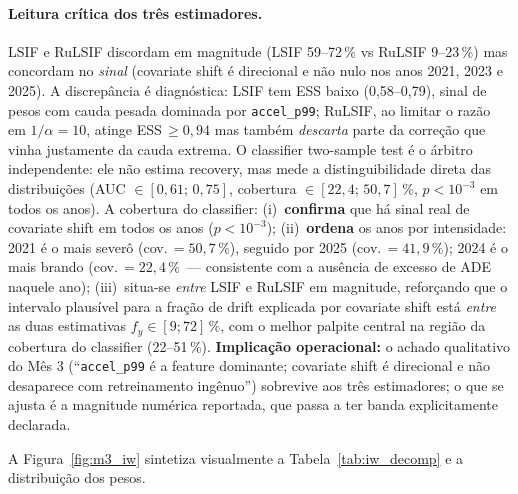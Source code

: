\documentclass[11pt,a4paper]{article}
\begin{document}
\paragraph{Leitura cr\'itica dos tr\^es estimadores.}
LSIF e RuLSIF discordam em magnitude (LSIF 59--72\,\% vs RuLSIF 9--23\,\%) mas concordam no \emph{sinal} (covariate shift \'e direcional e n\~ao nulo nos anos 2021, 2023 e 2025). A discrep\^ancia \'e diagn\'ostica:
LSIF tem ESS baixo (0{,}58--0{,}79), sinal de pesos com cauda pesada dominada por \texttt{accel\_p99};
RuLSIF, ao limitar o raz\~ao em $1/\alpha\!=\!10$, atinge ESS\,$\geq\!0{,}94$ mas tamb\'em \emph{descarta} parte da corre\c{c}\~ao que vinha justamente da cauda extrema.
O classifier two-sample test \cite{lopezpaz2017} \'e o \'arbitro independente: ele n\~ao estima recovery, mas mede a distinguibilidade direta das distribui\c{c}\~oes (AUC $\in [0{,}61;\,0{,}75]$, cobertura $\in[22{,}4;\,50{,}7]\,\%$, $p<10^{-3}$ em todos os anos). A cobertura do classifier:
(i)~\textbf{confirma} que h\'a sinal real de covariate shift em todos os anos ($p<10^{-3}$);
(ii)~\textbf{ordena} os anos por intensidade: 2021 \'e o mais sever\^o (cov.\,$=50{,}7\,\%$), seguido por 2025 (cov.\,$=41{,}9\,\%$); 2024 \'e o mais brando (cov.\,$=22{,}4\,\%$~--- consistente com a aus\^encia de excesso de ADE naquele ano);
(iii)~situa-se \emph{entre} LSIF e RuLSIF em magnitude, refor\c{c}ando que o intervalo plaus\'ivel para a fra\c{c}\~ao de drift explicada por covariate shift est\'a \emph{entre} as duas estimativas $f_y \in [9; 72]\,\%$, com o melhor palpite central na regi\~ao da cobertura do classifier (22--51\,\%).
\textbf{Implica\c{c}\~ao operacional:} o achado qualitativo do M\^es 3 (``\texttt{accel\_p99} \'e a feature dominante; covariate shift \'e direcional e n\~ao desaparece com retreinamento ing\^enuo'') sobrevive aos tr\^es estimadores; o que se ajusta \'e a magnitude num\'erica reportada, que passa a ter banda explicitamente declarada.

A Figura~\ref{fig:m3_iw} sintetiza visualmente a Tabela~\ref{tab:iw_decomp}
e a distribui\c{c}\~ao dos pesos.
\end{document}
